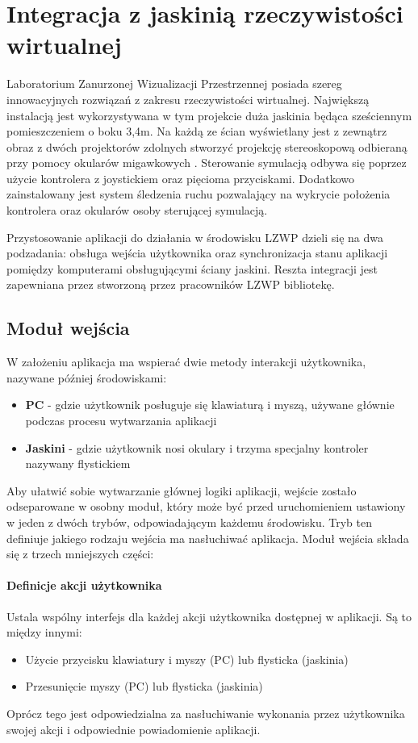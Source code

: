 \section{Integracja z jaskinią rzeczywistości wirtualnej}
Laboratorium Zanurzonej Wizualizacji Przestrzennej \cite{LZWP_article} posiada szereg innowacyjnych rozwiązań z zakresu rzeczywistości wirtualnej. Największą instalacją jest wykorzystywana w tym projekcie duża jaskinia będąca sześciennym pomieszczeniem o boku 3,4m. Na każdą ze ścian wyświetlany jest z zewnątrz obraz z dwóch projektorów zdolnych stworzyć projekcję stereoskopową odbieraną przy pomocy okularów migawkowych \cite{IntegraAV}. Sterowanie symulacją odbywa się poprzez użycie kontrolera z joystickiem oraz pięcioma przyciskami. Dodatkowo zainstalowany jest system śledzenia ruchu pozwalający na wykrycie położenia kontrolera oraz okularów osoby sterującej symulacją.

Przystosowanie aplikacji do działania w środowisku LZWP dzieli się na dwa podzadania: obsługa wejścia użytkownika oraz synchronizacja stanu aplikacji pomiędzy komputerami obsługującymi ściany jaskini. Reszta integracji jest zapewniana przez stworzoną przez pracowników LZWP bibliotekę.

\subsection{Moduł wejścia}
W założeniu aplikacja ma wspierać dwie metody interakcji użytkownika, nazywane później środowiskami:
\begin{itemize}
	\item \textbf{PC} - gdzie użytkownik posługuje się klawiaturą i myszą, używane głównie podczas procesu wytwarzania aplikacji
	\item \textbf{Jaskini} - gdzie użytkownik nosi okulary i trzyma specjalny kontroler nazywany flystickiem
\end{itemize}
Aby ułatwić sobie wytwarzanie głównej logiki aplikacji, wejście zostało odseparowane w osobny moduł, który może być przed uruchomieniem ustawiony w jeden z dwóch trybów, odpowiadającym każdemu środowisku. Tryb ten definiuje jakiego rodzaju wejścia ma nasłuchiwać aplikacja. Moduł wejścia składa się z trzech mniejszych części:
\paragraph{Definicje akcji użytkownika}
Ustala wspólny interfejs dla każdej akcji użytkownika dostępnej w aplikacji. Są to między innymi: 
\begin{itemize}
	\item Użycie przycisku klawiatury i myszy (PC) lub flysticka (jaskinia)
	\item Przesunięcie myszy (PC) lub flysticka (jaskinia)
\end{itemize}
Oprócz tego jest odpowiedzialna za nasłuchiwanie wykonania przez użytkownika swojej akcji i odpowiednie powiadomienie aplikacji.

